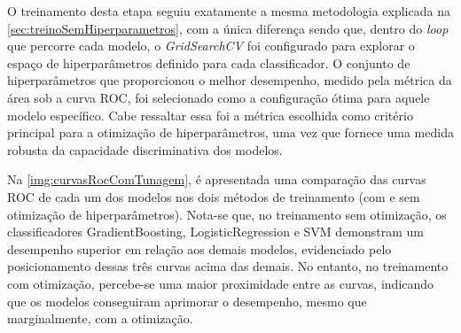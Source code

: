 O treinamento desta etapa seguiu exatamente a mesma metodologia explicada na \autoref{sec:treinoSemHiperparametros}, com a única diferença sendo que, dentro do \textit{loop} que percorre cada modelo, o \textit{GridSearchCV} foi configurado para explorar o espaço de hiperparâmetros definido para cada classificador. O conjunto de hiperparâmetros que proporcionou o melhor desempenho, medido pela métrica da área sob a curva ROC, foi selecionado como a configuração ótima para aquele modelo específico. Cabe ressaltar essa foi a métrica escolhida como critério principal para a otimização de hiperparâmetros, uma vez que fornece uma medida robusta da capacidade discriminativa dos modelos.

Na \autoref{img:curvasRocComTunagem}, é apresentada uma comparação das curvas ROC de cada um dos modelos nos dois métodos de treinamento (com e sem otimização de hiperparâmetros). Nota-se que, no treinamento sem otimização, os classificadores GradientBoosting, LogisticRegression e SVM demonstram um desempenho superior em relação aos demais modelos, evidenciado pelo posicionamento dessas três curvas acima das demais. No entanto, no treinamento com otimização, percebe-se uma maior proximidade entre as curvas, indicando que os modelos conseguiram aprimorar o desempenho, mesmo que marginalmente, com a otimização.

